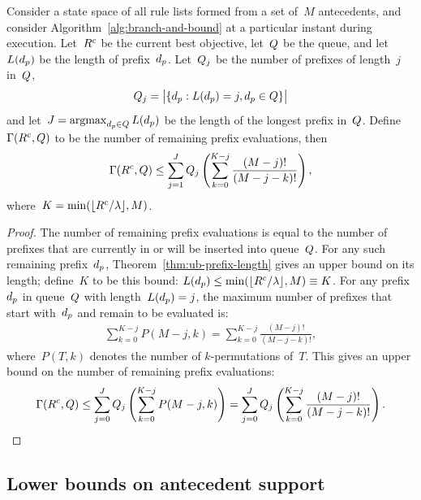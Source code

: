 \begin{proposition}
\label{prop:remaining-eval-coarse}
Consider a state space of all rule lists formed from a set of~$M$ antecedents,
and consider Algorithm~\ref{alg:branch-and-bound} at a particular instant
during execution.
%
Let~${R^c}$ be the current best objective, let~$Q$ be the queue,
and let~$L(d_p)$ be the length of prefix~$d_p$.
%
Let~$Q_j$ be the number of prefixes of length~$j$ in~$Q$,
\begin{align}
\Queue_j = \big | \{ \Prefix : L(\Prefix) = j, \Prefix \in \Queue \} \big |
\end{align}
and let~${J = \operatorname*{argmax}_{d_p \in Q} L(d_p)}$
be the length of the longest prefix in~$Q$.
%
Define~${\Gamma({R^c}, Q)}$ to be the number of remaining
prefix evaluations, then
\begin{align}
\Remaining(\CurrentObj, \Queue)
\le \sum_{j=1}^J \Queue_j \left( \sum_{k=0}^{K-j} \frac{(M-j)!}{(M-j - k)!} \right),
\end{align}
where~${K = \min(\lfloor {R^c} / {\lambda} \rfloor, M)}$.
\end{proposition}

\begin{proof}
The number of remaining prefix evaluations is equal to the number of
prefixes that are currently in or will be inserted into queue~$Q$.
%
For any such remaining prefix~$d_p$,
Theorem~\ref{thm:ub-prefix-length} gives an upper bound on its length;
define~$K$ to be this bound:
${L(d_p) \le \min(\lfloor {R^c} / {\lambda} \rfloor, M) \equiv K}$.
%
For any prefix~$d_p$ in queue~$Q$ with length~${L(d_p) = j}$,
the maximum number of prefixes that start with~$d_p$
and remain to be evaluated is:
\begin{align}
\sum_{k=0}^{K-j} P(M-j, k) = \sum_{k=0}^{K-j} \frac{(M-j)!}{(M-j - k)!},
\end{align}
where~${P(T, k)}$ denotes the number of $k$-permutations of~$T$.
%
This gives an upper bound on the number of remaining prefix evaluations:
\begin{align}
\Remaining(\CurrentObj, \Queue)
\le \sum_{j=0}^J \Queue_j \left( \sum_{k=0}^{K-j} P(M-j, k) \right)
= \sum_{j=0}^J \Queue_j \left( \sum_{k=0}^{K-j} \frac{(M-j)!}{(M-j - k)!} \right).
\end{align}
\end{proof}

\subsection{Lower bounds on antecedent support}
\label{sec:lb-support}

